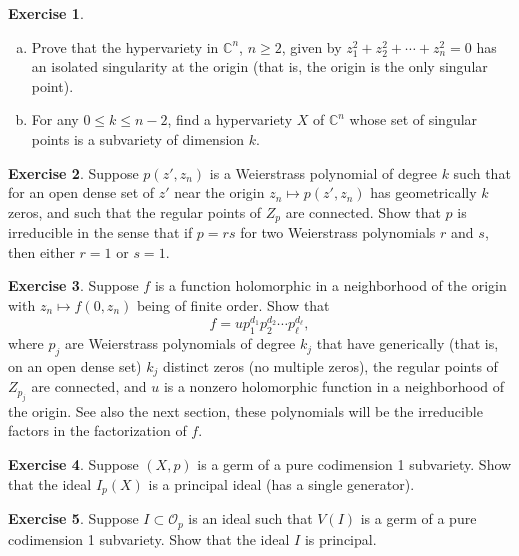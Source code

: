 \documentclass[12pt,openany]{book}
\newcommand{\C}{{\mathbb{C}}}
\newcommand{\sO}{{\mathscr{O}}}
\theoremstyle{plain}
\theoremstyle{remark}
\theoremstyle{definition}
\newenvironment{exbox}{%
    \def\FrameCommand{\vrule width 1pt \relax\hspace{10pt}}%
    \MakeFramed {\advance \hsize -\width \FrameRestore}%
}{%
    \endMakeFramed
}
\newenvironment{exparts}{%
    \leavevmode\begin{enumerate}[a),noitemsep,topsep=0pt,parsep=0pt,partopsep=0pt]
}{%
    \end{enumerate}
}
\theoremstyle{exercise}
\newtheorem{exercise}{Exercise}[section]
\theoremstyle{example}
\begin{document}
\begin{exbox}
\begin{exercise}
\begin{exparts}
\item
Prove that the hypervariety in $\C^n$, $n \geq 2$, given by $z_1^2 + z_2^2 + \cdots + z_n^2 = 0$
has an isolated singularity at the origin (that is, the origin is the only
singular point).
\item
For any $0 \leq k \leq n-2$, find a hypervariety $X$ of $\C^n$ whose set
of singular points is a subvariety of dimension $k$.
\end{exparts}
\end{exercise}

\begin{exercise}
Suppose $p(z',z_n)$ is a Weierstrass polynomial of degree $k$ such that
for an open dense set of $z'$ near the origin 
$z_n \mapsto p(z',z_n)$ has geometrically $k$ zeros, and such that the
regular points of $Z_p$ are connected.  Show that $p$ is
irreducible in the sense that if $p = rs$ for two Weierstrass polynomials
$r$ and $s$, then either $r=1$ or $s=1$.
\end{exercise}

\begin{samepage}
\begin{exercise}
Suppose $f$ is a function holomorphic in a neighborhood of the origin with
$z_n \mapsto f(0,z_n)$ being of finite order.  Show that
\begin{equation*}
f = u p_1^{d_1} p_2^{d_2} \cdots p_\ell^{d_\ell} ,
\end{equation*}
where $p_j$ are Weierstrass polynomials of degree $k_j$ that have
generically (that is, on an open dense set) $k_j$ distinct zeros
(no multiple zeros), the regular points of $Z_{p_j}$ are
connected, and $u$ is a nonzero holomorphic function
in a neighborhood of the origin.  See also the next section, these
polynomials will be the irreducible factors in the factorization of $f$.
\end{exercise}
\end{samepage}

\begin{exercise}
Suppose $(X,p)$ is a germ of a pure codimension 1 subvariety.  Show that
the ideal $I_p(X)$ is a principal ideal (has a single generator).
\end{exercise}

\begin{exercise}
Suppose $I \subset \sO_p$ is an ideal such that $V(I)$ is a germ of a pure codimension 1 subvariety.  Show that
the ideal $I$ is principal.
\end{exercise}


\end{exbox}
\end{document}
